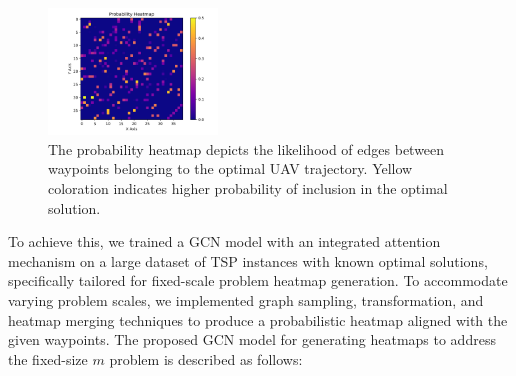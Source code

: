 \documentclass[sigconf]{acmart}
\begin{document}
\begin{figure}[htbp]
\centering
\includegraphics[width=0.4\textwidth]{fig/39-0.2-热图.png}

\caption{The probability heatmap depicts the likelihood of edges between waypoints belonging to the optimal UAV trajectory. Yellow coloration indicates higher probability of inclusion in the optimal solution.}
\label{fig:Probability Heatmap}
\end{figure}
To achieve this, we trained a GCN model with an integrated attention mechanism on a large dataset of TSP instances with known optimal solutions, specifically tailored for fixed-scale problem heatmap generation. To accommodate varying problem scales, we implemented graph sampling, transformation, and heatmap merging techniques to produce a probabilistic heatmap aligned with the given waypoints.
The proposed GCN model for generating heatmaps to address the fixed-size $m$ problem is described as follows:
\end{document}
